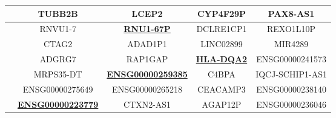 \documentclass[12pt]{report}
\begin{document}
\begin{table}[ht]
\begin{tabular}{@{}>{\raggedright}p{1.3cm}cccc@{}}
                        & \cellcolor{blue!20}TUBB2B & \cellcolor{red!20}LCEP2 & \cellcolor{blue!20}CYP4F29P & \cellcolor{blue!20}PAX8-AS1 \\
                        \midrule
                        \multirow{6}{*}{Γυναίκες}
                        & \cellcolor{red!20}RNVU1-7 & \cellcolor{blue!20}\textbf{\underline{RNU1-67P}} & \cellcolor{blue!20}DCLRE1CP1 & \cellcolor{red!20}REXO1L10P \\
                        & \cellcolor{red!20}CTAG2 & \cellcolor{red!20}ADAD1P1 & \cellcolor{blue!20}LINC02899 & \cellcolor{red!20}MIR4289 \\
                        & \cellcolor{red!20}ADGRG7 & \cellcolor{blue!20}RAP1GAP & \cellcolor{blue!20}\textbf{\underline{HLA-DQA2}} & \cellcolor{red!20}ENSG00000241573 \\
                        & \cellcolor{red!20}MRPS35-DT & \cellcolor{blue!20}\textbf{\underline{ENSG00000259385}} & \cellcolor{red!20}C4BPA & \cellcolor{red!20}IQCJ-SCHIP1-AS1 \\
                        & \cellcolor{red!20}ENSG00000275649 & \cellcolor{blue!20}ENSG00000265218 & \cellcolor{blue!20}CEACAMP3 & \cellcolor{red!20}ENSG00000238140 \\
                        & \cellcolor{red!20}\textbf{\underline{ENSG00000223779}} & \cellcolor{blue!20}CTXN2-AS1 & \cellcolor{blue!20}AGAP12P & \cellcolor{red!20}ENSG00000236046 \\
                        
                        \bottomrule
                    \end{tabular}
                    \label{tab:top-6-degs-strata}
                \end{table}
        \newpage
\end{document}
